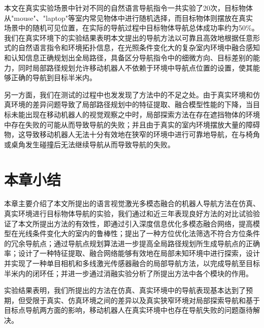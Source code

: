 本文在真实实验场景中针对不同的自然语言导航指令一共实验了20次，目标物体从"mouse"、"laptop"等室内常见物体中进行随机选择，而目标物体则摆放在真实场景中的随机可见位置，在实际的导航过程中目标物体导航总体成功率约为50\%。
我们在真实环境下的实验结果表明本文提出的导航方法以可靠且高效地根据任意形式的自然语言指令和环境拓扑信息，在光照条件变化大的复杂室内环境中融合感知和认知信息正确规划出全局路径，具备区分导航指令中的细微方向、目标差别的能力，同时局部路径规划允许移动机器人不依赖于环境中导航点位置的设置，使其能够正确的导航到目标半米内。

另一方面，我们在测试的过程中也发发现了方法中的不足之处。由于真实环境和仿真环境的差异问题导致了局部路径规划中的特征提取、融合模型性能的下降，当目标未能出现在移动机器人的视觉观察之中时，局部探索方法在存在遮挡物体的环境中存在失败的可能从而导致导航的失败；并且由于真实的室内环境摆放大量的障碍物，这导致移动机器人无法十分有效地在狭窄的环境中进行可靠地导航，在与椅角或桌角发生碰撞后无法继续导航从而导致导航的失败。


\section{本章小结}

本章主要介绍了本文所提出的语言视觉激光多模态融合的机器人导航方法在仿真、真实环境进行目标物体导航的实验，我们通过和近三年表现良好方法的对比试验验证了本文所提出方法的有效性，即通过引入深度信息优化多模态融合网络，提高模型在光线条件变化大的室内的鲁棒性；提出了一种方位优化法筛选不符合方位条件的冗余导航点；通过导航点规划算法进一步提高全局路径规划所生成导航点的正确率；设计了一种特征提取、融合网络能够有效地在局部未知环境中进行探索，设计并实现了一种单目相机和多线激光传感器融合的局部导航方法，以完成导航至目标半米内的闭环任；并进一步通过消融实验分析了所提出方法中各个模块的作用。

实验结果表明，我们所提出的方法在仿真、真实环境中的导航表现基本达到了预期，但受限于真实、仿真环境之间的差异以及真实狭窄环境对局部探索导航和基于目标点导航两方面的影响，移动机器人在真实环境中也存在导航失败的问题亟待解决。